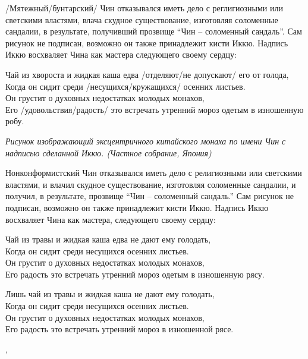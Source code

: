 \begin{ver}
/Мятежный/бунтарский/ Чин отказывался иметь дело с
реглигиозными или светскими властями, влача скудное существование,
изготовляя соломенные сандалии, в результате, получивший прозвище
``Чин -- соломенный сандаль''. Сам рисунок не подписан, возможно он
также принадлежит кисти Иккю. Надпись Иккю восхваляет Чина как мастера
следующего своему сердцу:
\end{ver}

\begin{ver}
  \begin{verses}
    Чай из хвороста и жидкая каша едва /отделяют/не
    допускают/ его от голода,\\
    Когда он сидит среди /несущихся/кружащихся/ осенних
    листьев.\\
    Он грустит о духовных недостатках молодых монахов,\\
    Его /удовольствия/радость/ это встречать утренний мороз одетым в
    изношенную робу.
  \end{verses}
\end{ver}

\begin{ver}[1]\it
Рисунок изображающий эксцентричного китайского монаха по имени Чин с надписью
сделанной Иккю. (Частное собрание, Япония)
\end{ver}

\begin{ver}[1]
Нонконформистский Чин отказывался иметь дело с
религиозными или светскими властями, и влачил скудное существование,
изготовляя соломенные сандалии, и получил, в результате, прозвище
``Чин -- соломенный сандаль.'' Сам рисунок не подписан, возможно он
также принадлежит кисти Иккю. Надпись Иккю восхваляет Чина как мастера,
следующего своему сердцу:
\end{ver}

\begin{ver}[1]
  \begin{verses}
    Чай из травы и жидкая каша едва не дают ему голодать,\\
    Когда он сидит среди несущихся осенних листьев.\\
    Он грустит о духовных недостатках молодых монахов,\\
    Его радость это встречать утренний мороз одетым в
    изношенную рясу.
  \end{verses}
\end{ver}
\begin{ver}[2]
  \begin{verses}
    Лишь чай из травы и жидкая каша не дают ему голодать,\\
    Когда он сидит среди несущихся осенних листьев.\\
    Он грустит о духовных недостатках молодых монахов,\\
    Его радость это встречать утренний мороз в
    изношенной рясе.
  \end{verses}
\end{ver}
\sep

